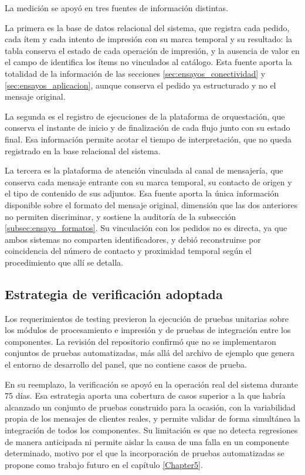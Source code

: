 La medición se apoyó en tres fuentes de información distintas.

La primera es la base de datos relacional del sistema, que registra cada pedido, cada ítem y cada intento de impresión con su marca temporal y su resultado: la tabla  conserva el estado de cada operación de impresión, y la ausencia de valor en el campo  de  identifica los ítems no vinculados al catálogo. Esta fuente aporta la totalidad de la información de las secciones \ref{sec:ensayos_conectividad} y \ref{sec:ensayos_aplicacion}, aunque conserva el pedido ya estructurado y no el mensaje original.

La segunda es el registro de ejecuciones de la plataforma de orquestación, que conserva el instante de inicio y de finalización de cada flujo junto con su estado final. Esa información permite acotar el tiempo de interpretación, que no queda registrado en la base relacional del sistema.

La tercera es la plataforma de atención vinculada al canal de mensajería, que conserva cada mensaje entrante con su marca temporal, su contacto de origen y el tipo de contenido de sus adjuntos. Esa fuente aporta la única información disponible sobre el formato del mensaje original, dimensión que las dos anteriores no permiten discriminar, y sostiene la auditoría de la subsección \ref{subsec:ensayo_formatos}. Su vinculación con los pedidos no es directa, ya que ambos sistemas no comparten identificadores, y debió reconstruirse por coincidencia del número de contacto y proximidad temporal según el procedimiento que allí se detalla.

\subsection{Estrategia de verificación adoptada}
\label{subsec:estrategia_verificacion}

Los requerimientos de testing previeron la ejecución de pruebas unitarias sobre los módulos de procesamiento e impresión y de pruebas de integración entre los componentes. La revisión del repositorio confirmó que no se implementaron conjuntos de pruebas automatizadas, más allá del archivo de ejemplo que genera el entorno de desarrollo del panel, que no contiene casos de prueba.

En su reemplazo, la verificación se apoyó en la operación real del sistema durante 75 días. Esa estrategia aporta una cobertura de casos superior a la que habría alcanzado un conjunto de pruebas construido para la ocasión, con la variabilidad propia de los mensajes de clientes reales, y permite validar de forma simultánea la integración de todos los componentes. Su limitación es que no detecta regresiones de manera anticipada ni permite aislar la causa de una falla en un componente determinado, motivo por el que la incorporación de pruebas automatizadas se propone como trabajo futuro en el capítulo \ref{Chapter5}.

